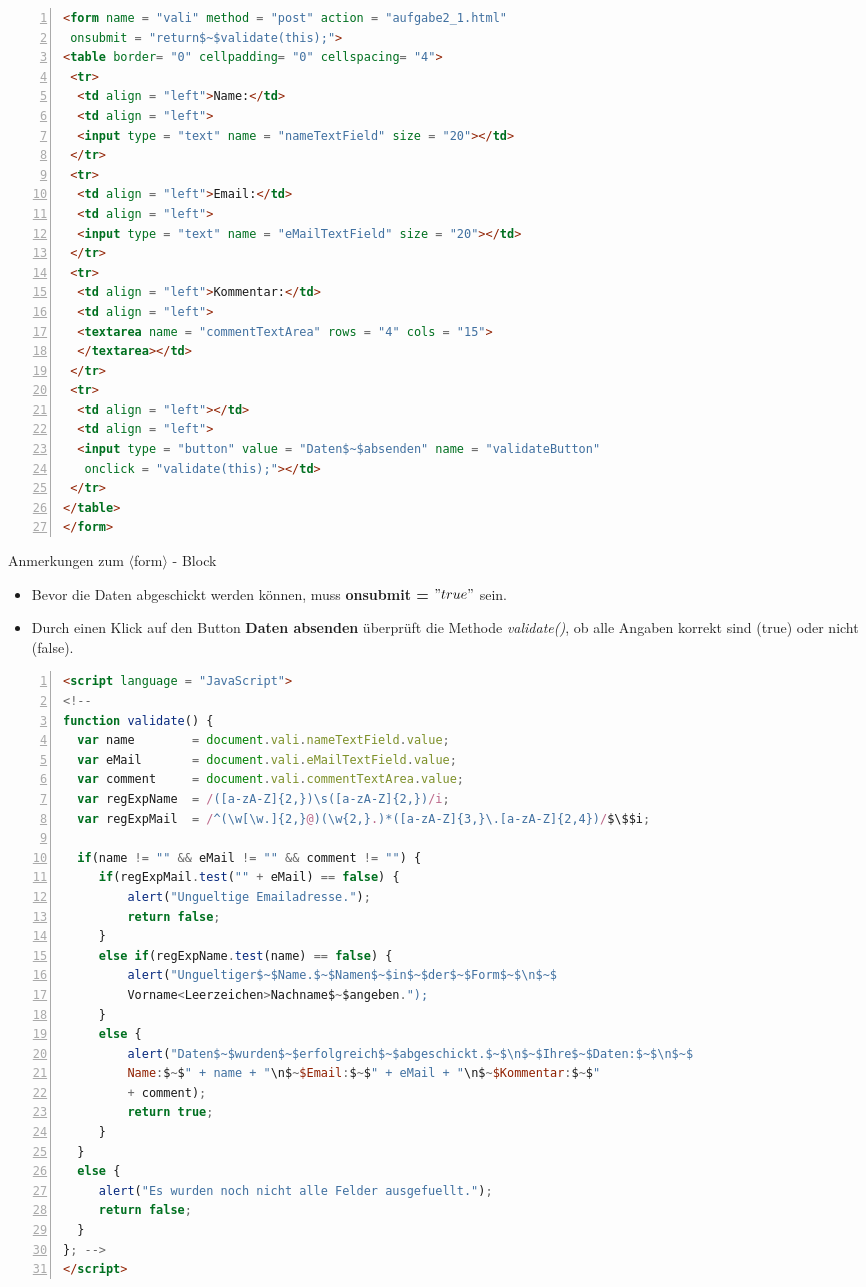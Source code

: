 \documentclass{beamer}
\begin{document}
\tiny{\begin{lstlisting}[language = HTML,
				   mathescape = true, 
                   morekeywords = {onsubmit, onclick, this, return}, 
                   numbers = left, 
                   numbersep = 3pt]
 <form name = "vali" method = "post" action = "aufgabe2_1.html"
 onsubmit = "return$~$validate(this);">
<table border= "0" cellpadding= "0" cellspacing= "4">
 <tr>
  <td align = "left">Name:</td>
  <td align = "left">
  <input type = "text" name = "nameTextField" size = "20"></td>
 </tr>
 <tr>
  <td align = "left">Email:</td>
  <td align = "left">
  <input type = "text" name = "eMailTextField" size = "20"></td>
 </tr>
 <tr>
  <td align = "left">Kommentar:</td>
  <td align = "left">
  <textarea name = "commentTextArea" rows = "4" cols = "15">
  </textarea></td>
 </tr>
 <tr>
  <td align = "left"></td>
  <td align = "left">
  <input type = "button" value = "Daten$~$absenden" name = "validateButton" 
   onclick = "validate(this);"></td>
 </tr>
</table>
</form>
\end{lstlisting}}

\begin{frame}{Anmerkungen zum $\langle$form$\rangle$ - Block}
\normalsize{
\begin{itemize}
\item Bevor die Daten abgeschickt werden können, muss {\bf onsubmit = $"true"$} sein.
\item Durch einen Klick auf den Button {\bf Daten absenden} überprüft die Methode {\it validate()}, ob alle Angaben korrekt sind (true) oder nicht (false).
\end{itemize}}
\end{frame}

\tiny{
\begin{lstlisting}[language = HTML,
				   mathescape = true, 
                   morekeywords = {onsubmit, onclick, this, return, function, if, else}, 
                   numbers = left, 
                   numbersep = 3pt]
<script language = "JavaScript">
<!--
function validate() {
  var name        = document.vali.nameTextField.value;
  var eMail       = document.vali.eMailTextField.value;
  var comment     = document.vali.commentTextArea.value;
  var regExpName  = /([a-zA-Z]{2,})\s([a-zA-Z]{2,})/i;
  var regExpMail  = /^(\w[\w.]{2,}@)(\w{2,}.)*([a-zA-Z]{3,}\.[a-zA-Z]{2,4})/$\$$i;
	
  if(name != "" && eMail != "" && comment != "") {
	 if(regExpMail.test("" + eMail) == false) {
		 alert("Ungueltige Emailadresse.");
		 return false;
	 }
	 else if(regExpName.test(name) == false) {
		 alert("Ungueltiger$~$Name.$~$Namen$~$in$~$der$~$Form$~$\n$~$
		 Vorname<Leerzeichen>Nachname$~$angeben.");
	 }	
	 else { 
		 alert("Daten$~$wurden$~$erfolgreich$~$abgeschickt.$~$\n$~$Ihre$~$Daten:$~$\n$~$
		 Name:$~$" + name + "\n$~$Email:$~$" + eMail + "\n$~$Kommentar:$~$" 
		 + comment);	
		 return true;	
	 }
  }
  else {
	 alert("Es wurden noch nicht alle Felder ausgefuellt.");
	 return false;
  }
}; -->
</script>
\end{lstlisting}}
\end{document}

